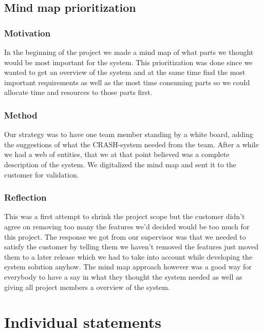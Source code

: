 \documentclass[10pt]{article}
\begin{document}
\subsection{Mind map prioritization}
\subsubsection{Motivation}
In the beginning of the project we made a mind map of what parts we thought would be most important for the system. This prioritization was done since we wanted to get an overview of the system and at the same time find the most important requirements as well as the most time consuming parts so we could allocate time and resources to those parts first.
\subsubsection{Method}
Our strategy was to have one team member standing by a white board, adding the suggestions of what the CRASH-system needed from the team. After a while we had a web of entities, that we at that point believed was a complete description of the system. We digitalized the mind map and sent it to the customer for validation. 
\subsubsection{Reflection}
This was a first attempt to shrink the project scope but the customer didn't agree on removing too many the features we'd decided would be too much for this project. The response we got from our supervisor was that we needed to satisfy the customer by telling them we haven't removed the features just moved them to a later release which we had to take into account while developing the system solution anyhow.
The mind map approach however was a good way for everybody to have a say in what they thought the system needed as well as giving all project members a overview of the system.


\section{Individual statements}
\noindent
{}
\end{document}
